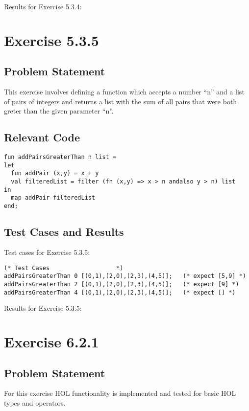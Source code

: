 \documentclass[letterpaper]{report}
\begin{document}
Results for Exercise 5.3.4:



\newpage



\chapter{Exercise 5.3.5}
\label{sec:ex-5-3-5}

\section{Problem Statement}
This exercise involves defining a function which accepts a number ``n'' and  a list of pairs of integers
and returns a list with the sum of all pairs that were both greter than the given parameter ``n''. 

\section{Relevant Code}

\begin{lstlisting}
fun addPairsGreaterThan n list =
let
  fun addPair (x,y) = x + y
  val filteredList = filter (fn (x,y) => x > n andalso y > n) list
in
  map addPair filteredList
end;
\end{lstlisting}

\section{Test Cases and Results}

Test cases for Exercise 5.3.5:
\begin{lstlisting}
(* Test Cases                   *)
addPairsGreaterThan 0 [(0,1),(2,0),(2,3),(4,5)];   (* expect [5,9] *)
addPairsGreaterThan 2 [(0,1),(2,0),(2,3),(4,5)];   (* expect [9] *)
addPairsGreaterThan 4 [(0,1),(2,0),(2,3),(4,5)];   (* expect [] *)
\end{lstlisting}

Results for Exercise 5.3.5:



\newpage


\chapter{Exercise 6.2.1}
\label{sec:ex-6-2-1}

\section{Problem Statement}
For this exercise HOL functionality is implemented and tested for basic HOL types and operators.
\end{document}
